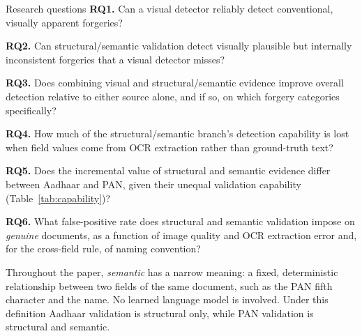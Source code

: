 \documentclass[VANCOUVER,Times1COL]{WileyNJDv5}
\begin{document}
\begin{rqbox}{Research questions}
\textbf{RQ1.} Can a visual detector reliably detect conventional,
visually apparent forgeries?\par\smallskip
\textbf{RQ2.} Can structural/semantic validation detect visually
plausible but internally inconsistent forgeries that a visual detector
misses?\par\smallskip
\textbf{RQ3.} Does combining visual and structural/semantic evidence
improve overall detection relative to either source alone, and if so,
on which forgery categories specifically?\par\smallskip
\textbf{RQ4.} How much of the structural/semantic branch's detection
capability is lost when field values come from OCR extraction rather
than ground-truth text?\par\smallskip
\textbf{RQ5.} Does the incremental value of structural and semantic
evidence differ between Aadhaar and PAN, given their unequal validation
capability (Table~\ref{tab:capability})?\par\smallskip
\textbf{RQ6.} What false-positive rate does structural and semantic
validation impose on \emph{genuine} documents, as a function of image
quality and OCR extraction error and, for the cross-field rule, of
naming convention?
\end{rqbox}

Throughout the paper, \emph{semantic} has a narrow meaning: a fixed,
deterministic relationship between two fields of the same document,
such as the PAN fifth character and the name. No learned language model
is involved. Under this definition Aadhaar validation is structural
only, while PAN validation is structural and semantic.
\end{document}
